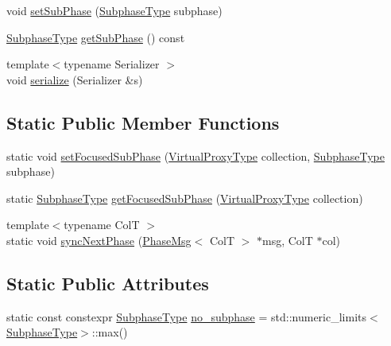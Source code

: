 \begin{DoxyCompactItemize}
\item 
void \hyperlink{structvt_1_1vrt_1_1collection_1_1balance_1_1_element_stats_a6f24460421195baa579f9a0dc7f6569c}{set\+Sub\+Phase} (\hyperlink{namespacevt_ae78cbfdf1e57470e33eedb074f2beeba}{Subphase\+Type} subphase)
\item 
\hyperlink{namespacevt_ae78cbfdf1e57470e33eedb074f2beeba}{Subphase\+Type} \hyperlink{structvt_1_1vrt_1_1collection_1_1balance_1_1_element_stats_aa6876c8014bf0b9c9bf0061ed70ad721}{get\+Sub\+Phase} () const
\item 
{\footnotesize template$<$typename Serializer $>$ }\\void \hyperlink{structvt_1_1vrt_1_1collection_1_1balance_1_1_element_stats_a2a329a760a794097651a78157cf12452}{serialize} (Serializer \&s)
\end{DoxyCompactItemize}
\subsection*{Static Public Member Functions}
\begin{DoxyCompactItemize}
\item 
static void \hyperlink{structvt_1_1vrt_1_1collection_1_1balance_1_1_element_stats_a783aba29f79b50652c78ca148b766578}{set\+Focused\+Sub\+Phase} (\hyperlink{namespacevt_a1b417dd5d684f045bb58a0ede70045ac}{Virtual\+Proxy\+Type} collection, \hyperlink{namespacevt_ae78cbfdf1e57470e33eedb074f2beeba}{Subphase\+Type} subphase)
\item 
static \hyperlink{namespacevt_ae78cbfdf1e57470e33eedb074f2beeba}{Subphase\+Type} \hyperlink{structvt_1_1vrt_1_1collection_1_1balance_1_1_element_stats_ac52b9e7f8ba66cc20e8130fa1e037e07}{get\+Focused\+Sub\+Phase} (\hyperlink{namespacevt_a1b417dd5d684f045bb58a0ede70045ac}{Virtual\+Proxy\+Type} collection)
\item 
{\footnotesize template$<$typename ColT $>$ }\\static void \hyperlink{structvt_1_1vrt_1_1collection_1_1balance_1_1_element_stats_a8238b75b708497ec5969235c52b2d338}{sync\+Next\+Phase} (\hyperlink{namespacevt_1_1vrt_1_1collection_1_1balance_a7120dc064f6e8c4157a5f4c81b825393}{Phase\+Msg}$<$ ColT $>$ $\ast$msg, ColT $\ast$col)
\end{DoxyCompactItemize}
\subsection*{Static Public Attributes}
\begin{DoxyCompactItemize}
\item 
static const constexpr \hyperlink{namespacevt_ae78cbfdf1e57470e33eedb074f2beeba}{Subphase\+Type} \hyperlink{structvt_1_1vrt_1_1collection_1_1balance_1_1_element_stats_a26682687c88b2c607365b040a9804096}{no\+\_\+subphase} = std\+::numeric\+\_\+limits$<$\hyperlink{namespacevt_ae78cbfdf1e57470e33eedb074f2beeba}{Subphase\+Type}$>$\+::max()
\end{DoxyCompactItemize}
